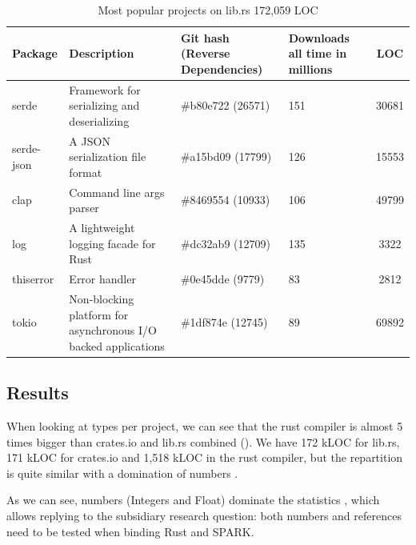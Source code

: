 \documentclass[nomenclature, english, bibtex]{kththesis}
\begin{document}
\begin{table}[ht!]
\footnotesize
\centering
\caption{Most popular projects on lib.rs 172,059 LOC}
\label{tab:lib_rs}
\renewcommand{\arraystretch}{1.5}
\begin{tabular}{ |l|>{\raggedright}p{4cm}|>{\raggedright}p{3cm}|>{\centering\arraybackslash}p{1.8cm}| S[table-format=7.0]| }
\hline
{}
\textbf{Package}& \textbf{Description} & \textbf{Git hash} \newline \textbf{(Reverse Dependencies)}&\textbf{Downloads} \newline \textbf{all time in millions} & \textbf{LOC}\\
\hline
serde & Framework for serializing and deserializing & \#b80e722 (\num{26571}) & \num{151} & \num{30681} \\
\hline
serde-json & A JSON serialization file format & \#a15bd09 (\num{17799}) & \num{126} & \num{15553} \\
\hline
clap & Command line args parser & \#8469554 (\num{10933}) & \num{106} & \num{49799} \\
\hline
log & A lightweight logging facade for Rust & \#dc32ab9 (\num{12709}) & \num{135} & \num{3322} \\
\hline
thiserror & Error handler & \#0e45dde (\num{9779}) & \num{83} & \num{2812} \\
\hline
tokio & Non-blocking platform for asynchronous I/O backed applications & \#1df874e (\num{12745}) & \num{89} & \num{69892} \\
\hline
\end{tabular}
\end{table}
\FloatBarrier

\subsection{Results}

When looking at types per project, we can see that the rust compiler is almost 5 times bigger than crates.io and lib.rs combined (). We have 172 k\gls{LOC} for lib.rs,  171 kLOC for crates.io and 1,518 kLOC in the rust compiler, but the repartition is quite similar with a domination of numbers . 

As we can see, numbers (Integers and Float) dominate the statistics , which allows replying to the subsidiary research question: both numbers and references need to be tested when binding Rust and SPARK.
\end{document}
